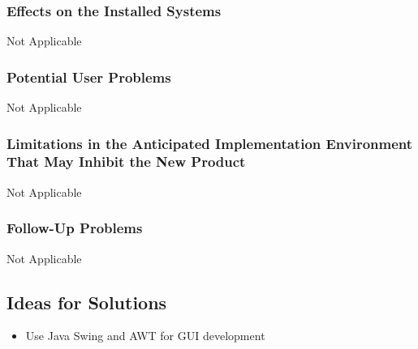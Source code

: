 \documentclass[12pt]{article}
\begin{document}
\subsubsection{Effects on the Installed Systems}
Not Applicable
\subsubsection{Potential User Problems}
Not Applicable
\subsubsection{Limitations in the Anticipated Implementation Environment That 
May Inhibit the New Product}
Not Applicable
\subsubsection{Follow-Up Problems}
Not Applicable

\subsection{Ideas for Solutions}
\begin{itemize}
	\item Use Java Swing and AWT for GUI development
\end{itemize}
\end{document}

